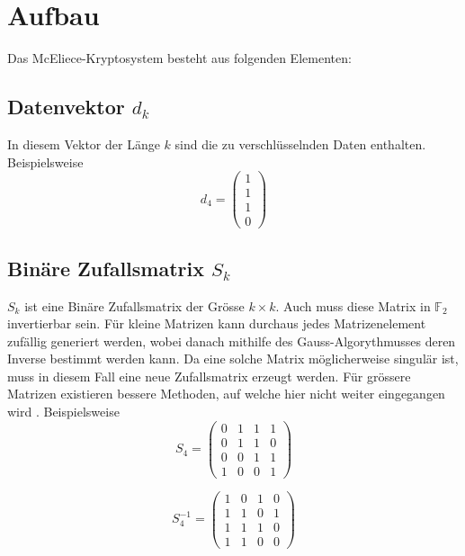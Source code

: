 %
%
%
\section{Aufbau\label{mceliece:section:Aufbau}}
Das McEliece-Kryptosystem besteht aus folgenden Elementen:

\subsection{Datenvektor $d_k$
\label{mceliece:subsection:d_k}}
In diesem Vektor der Länge $k$ sind die zu verschlüsselnden Daten enthalten.
Beispielsweise
\[d_4=
\begin{pmatrix}
    1\\
    1\\
    1\\
    0 
\end{pmatrix}
\]

\subsection{Binäre Zufallsmatrix $S_k$
\label{mceliece:subsection:s_k}}
$S_k$ ist eine Binäre Zufallsmatrix der Grösse $k \times k$.
Auch muss diese Matrix in $\mathbb{F}_2$ invertierbar sein.
Für kleine Matrizen kann durchaus jedes Matrizenelement zufällig generiert werden,
wobei danach mithilfe des Gauss-Algorythmusses deren Inverse bestimmt werden kann.
Da eine solche Matrix möglicherweise singulär ist, muss in diesem Fall eine neue Zufallsmatrix erzeugt werden.
Für grössere Matrizen existieren bessere Methoden, auf welche hier nicht weiter eingegangen wird \cite{mceliece:GenerationRandMatrix}.
Beispielsweise
\[S_4=
\begin{pmatrix}
    0 & 1 & 1 & 1\\
    0 & 1 & 1 & 0\\
    0 & 0 & 1 & 1\\
    1 & 0 & 0 & 1
\end{pmatrix}
\]

\[
    S_4^{-1}=
    \begin{pmatrix}
        1 & 0 & 1 & 0\\
        1 & 1 & 0 & 1\\
        1 & 1 & 1 & 0\\
        1 & 1 & 0 & 0
    \end{pmatrix}
\]

